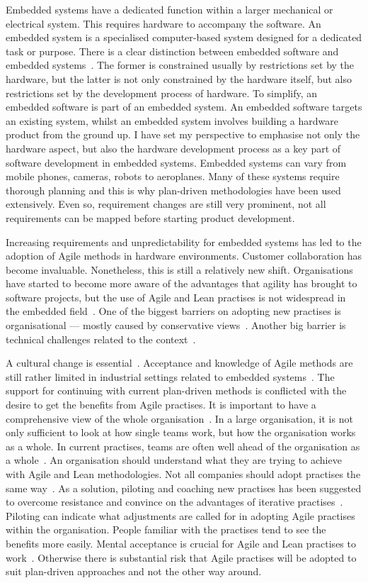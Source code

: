\documentclass[english]{tktltiki2}
\begin{document}
Embedded systems have a dedicated function within a larger mechanical or electrical system. This requires hardware to accompany the software. An embedded system is a specialised computer-based system designed for a dedicated task or purpose. There is a clear distinction between embedded software and embedded systems~\cite{KRM13}. The former is constrained usually by restrictions set by the hardware, but the latter is not only constrained by the hardware itself, but also restrictions set by the development process of hardware. To simplify, an embedded software is part of an embedded system. An embedded software targets an existing system, whilst an embedded system involves building a hardware product from the ground up. I have set my perspective to emphasise not only the hardware aspect, but also the hardware development process as a key part of software development in embedded systems. Embedded systems can vary from mobile phones, cameras, robots to aeroplanes. Many of these systems require thorough planning and this is why plan-driven methodologies have been used extensively. Even so, requirement changes are still very prominent, not all requirements can be mapped before starting product development.

Increasing requirements and unpredictability for embedded systems has led to the adoption of Agile methods in hardware environments. Customer collaboration has become invaluable. Nonetheless, this is still a relatively new shift. Organisations have started to become more aware of the advantages that agility has brought to software projects, but the use of Agile and Lean practises is not widespread in the embedded field~\cite{CWR10, EB12, KRM13}. One of the biggest barriers on adopting new practises is organisational — mostly caused by conservative views~\cite{Pop02, HAB12}. Another big barrier is technical challenges related to the context~\cite{KRM13}.

A cultural change is essential~\cite{HAB12, KRM13}. Acceptance and knowledge of Agile methods are still rather limited in industrial settings related to embedded systems~\cite{HMP12}. The support for continuing with current plan-driven methods is conflicted with the desire to get the benefits from Agile practises. It is important to have a comprehensive view of the whole organisation~\cite{KRM13}. In a large organisation, it is not only sufficient to look at how single teams work, but how the organisation works as a whole. In current practises, teams are often well ahead of the organisation as a whole~\cite{HAB12}. An organisation should understand what they are trying to achieve with Agile and Lean methodologies. Not all companies should adopt practises the same way~\cite{KRM13}. As a solution, piloting and coaching new practises has been suggested to overcome resistance and convince on the advantages of iterative practises~\cite{CWR10, EB12, HMP12, KRM13}. Piloting can indicate what adjustments are called for in adopting Agile practises within the organisation. People familiar with the practises tend to see the benefits more easily. Mental acceptance is crucial for Agile and Lean practises to work~\cite{HMP12}. Otherwise there is substantial risk that Agile practises will be adopted to suit plan-driven approaches and not the other way around.
\end{document}
